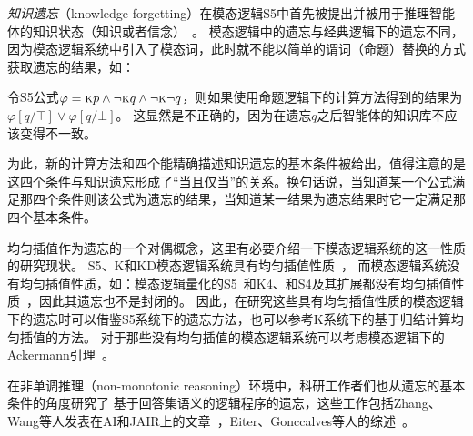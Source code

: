 \emph{知识遗忘}（knowledge forgetting）在模态逻辑S5中首先被提出并被用于推理智能体的知识状态（知识或者信念）~\cite{Yan:AIJ:2009}。
模态逻辑中的遗忘与经典逻辑下的遗忘不同，因为模态逻辑系统中引入了模态词，此时就不能以简单的谓词（命题）替换的方式获取遗忘的结果，如：
\begin{example}\cite{Zhang2008Properties}
	令S5公式$\varphi=\textsc{k} p \wedge \neg \textsc{k} q \wedge \neg \textsc{k} \neg q$，则如果使用命题逻辑下的计算方法得到的结果为$\varphi[q/\top] \vee \varphi[q/\bot]$。
	这显然是不正确的，因为在遗忘$q$之后智能体的知识库不应该变得不一致。
\end{example}
为此，新的计算方法和四个能精确描述知识遗忘的基本条件被给出，值得注意的是这四个条件与知识遗忘形成了“当且仅当”的关系。换句话说，当知道某一个公式满足那四个条件则该公式为遗忘的结果，当知道某一结果为遗忘结果时它一定满足那四个基本条件。

均匀插值作为遗忘的一个对偶概念，这里有必要介绍一下模态逻辑系统的这一性质的研究现状。
S5、K和KD模态逻辑系统具有均匀插值性质~\cite{DBLP:journals/aml/Iemhoff19}，
而模态逻辑系统没有均匀插值性质，如：模态逻辑量化的S5~\cite{DBLP:journals/jsyml/Fine79}和K4、和S4及其扩展都没有均匀插值性质~\cite{DBLP:journals/ndjfl/Schumm86}，因此其遗忘也不是封闭的。
因此，在研究这些具有均匀插值性质的模态逻辑下的遗忘时可以借鉴S5系统下的遗忘方法，也可以参考K系统下的基于归结计算均匀插值的方法。
对于那些没有均匀插值的模态逻辑系统可以考虑模态逻辑下的Ackermann引理~\cite{DBLP:books/daglib/0023036}。



在非单调推理（non-monotonic reasoning）环境中，科研工作者们也从遗忘的基本条件的角度研究了
基于回答集语义的逻辑程序的遗忘，这些工作包括Zhang、Wang等人发表在AI和JAIR上的文章~\cite{DBLP:Zhang:AIJ2006,DBLP:journals/ai/EiterW08,Wong:PhD:Thesis,DBLP:journals/jair/WangZZZ14,wang2013forgetting,DBLP:journals/jair/Delgrande17,gonccalves2020limits}，Eiter、Gonccalves等人的综述~\cite{eiter2019brief,gonccalves2021forgetting}。


